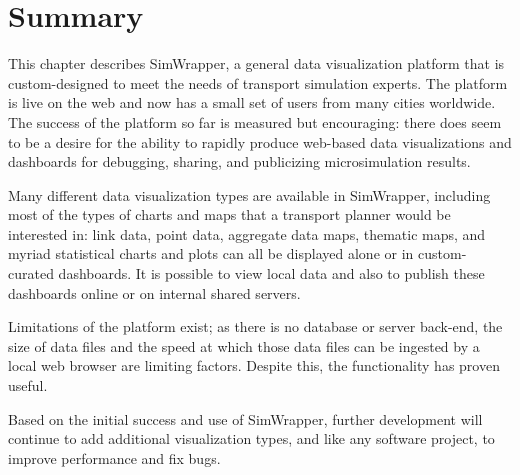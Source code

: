 
\hypertarget{simwrapper-summary}{%
\section{Summary}\label{simwrapper-summary}}

This chapter describes SimWrapper, a general data visualization platform that is custom-designed to meet the needs of transport simulation experts. The platform is live on the web and now has a small set of users from many cities worldwide. The success of the platform so far is measured but encouraging: there does seem to be a desire for the ability to rapidly produce web-based data visualizations and dashboards for debugging, sharing, and publicizing microsimulation results.

Many different data visualization types are available in SimWrapper, including most of the types of charts and maps that a transport planner would be interested in: link data, point data, aggregate data maps, thematic maps, and myriad statistical charts and plots can all be displayed alone or in custom-curated dashboards. It is possible to view local data and also to publish these dashboards online or on internal shared servers.

Limitations of the platform exist; as there is no database or server back-end, the size of data files and the speed at which those data files can be ingested by a local web browser are limiting factors. Despite this, the functionality has proven useful.

Based on the initial success and use of SimWrapper, further development will continue to add additional visualization types, and like any software project, to improve performance and fix bugs.